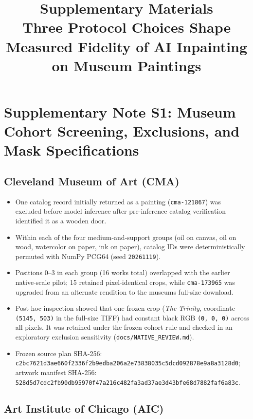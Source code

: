 \documentclass[11pt,a4paper]{article}
\title{Supplementary Materials\\[.25em]\large Three Protocol Choices Shape Measured Fidelity of AI Inpainting on Museum Paintings}
\author{}
\date{}
\providecommand{\tightlist}{\setlength{\itemsep}{0pt}\setlength{\parskip}{0pt}}
\begin{document}
\maketitle
\setcounter{secnumdepth}{0}
\section{Supplementary Note S1: Museum Cohort Screening, Exclusions, and Mask Specifications}\label{supplementary-note-s1-museum-cohort-screening-exclusions-and-mask-specifications}

\subsection{Cleveland Museum of Art (CMA)}\label{cleveland-museum-of-art-cma}

\begin{itemize}
\tightlist
\item
  One catalog record initially returned as a painting (\texttt{cma-121867}) was excluded before model inference after pre-inference catalog verification identified it as a wooden door.
\item
  Within each of the four medium-and-support groups (oil on canvas, oil on wood, watercolor on paper, ink on paper), catalog IDs were deterministically permuted with NumPy PCG64 (seed \texttt{20261119}).
\item
  Positions 0--3 in each group (16 works total) overlapped with the earlier native-scale pilot; 15 retained pixel-identical crops, while \texttt{cma-173965} was upgraded from an alternate rendition to the museum\textquotesingle s full-size download.
\item
  Post-hoc inspection showed that one frozen crop (\emph{The Trinity}, coordinate \texttt{(5145,\ 503)} in the full-size TIFF) had constant black RGB \texttt{(0,\ 0,\ 0)} across all pixels. It was retained under the frozen cohort rule and checked in an exploratory exclusion sensitivity (\nolinkurl{docs/NATIVE_REVIEW.md}).
\item
  Frozen source plan SHA-256: \nolinkurl{c2bc7621d3ae660f2336f2b9edba206a2e73838035c5dcd092878e9a8a3128d0}; artwork manifest SHA-256: \nolinkurl{528d5d7cdc2fb90db95970f47a216c482fa3ad37ae3d43bfe68d7882faf6a83c}.
\end{itemize}

\subsection{Art Institute of Chicago (AIC)}\label{art-institute-of-chicago-aic}
\end{document}
